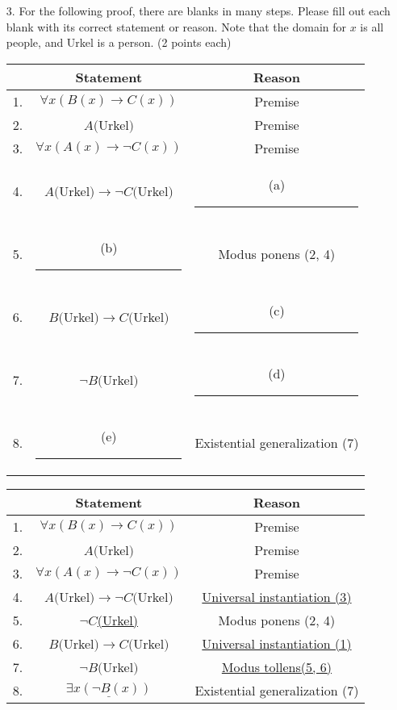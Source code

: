 \begin{enumerate}
    
    \item[3.]{For the following proof, there are blanks in many steps. Please fill out each blank with its correct statement or reason. Note that the domain for $x$ is all people, and Urkel is a person. \hfill\hfill \color{blue}(2 points each)}\
    \begin{center}
    \renewcommand{\arraystretch}{2}
    \begin{tabular}{rc|c}
        & \textbf{Statement} & \textbf{Reason} \\\hline
        1. & $\forall x (B(x) \to C(x))$ & Premise \\
        2. & $A($Urkel$)$ & Premise  \\
        3. & $\forall x (A(x) \to \lnot C(x))$ & Premise\\
        4. & $A($Urkel$) \to \lnot C($Urkel$)$ & (a) \rule{4cm}{0.15mm}  \\
        5. & (b) \rule{4cm}{0.15mm}  & Modus ponens (2, 4)\\
        6. & $B($Urkel$) \to C($Urkel$)$ & (c) \rule{4cm}{0.15mm}\\
        7. & $\lnot B($Urkel$)$ & (d) \rule{4cm}{0.15mm}\\
        8. & (e) \rule{4cm}{0.15mm} & Existential generalization (7)
    \end{tabular}
    \end{center}
    \begin{solution}
    \begin{center}
    \renewcommand{\arraystretch}{2}
    \begin{tabular}{rc|c}
        & \textbf{Statement} & \textbf{Reason} \\\hline
        1. & $\forall x (B(x) \to C(x))$ & Premise \\
        2. & $A($Urkel$)$ & Premise  \\
        3. & $\forall x (A(x) \to \lnot C(x))$ & Premise\\
        4. & $A($Urkel$) \to \lnot C($Urkel$)$ & \underline{Universal instantiation (3)}  \\
        5. & \underline{$\lnot C$(Urkel)} & Modus ponens (2, 4)\\
        6. & $B($Urkel$) \to C($Urkel$)$ & \underline{Universal instantiation (1)}\\
        7. & $\lnot B($Urkel$)$ & \underline{Modus tollens(5, 6)}\\
        8. & $\underline{\exists x (\lnot B(x))}$ & Existential generalization (7)
    \end{tabular}
    \end{center} 
    \end{solution}





\end{enumerate}
